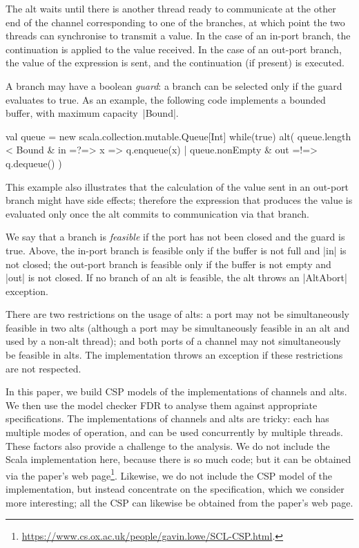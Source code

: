 The alt waits until there is another thread ready to communicate at the other
end of the channel corresponding to one of the branches, at which point the
two threads can synchronise to transmit a value.  In the case of an in-port
branch, the continuation is applied to the value received.  In the case of an
out-port branch, the value of the expression is sent, and the continuation (if
present) is executed.

A branch may have a boolean \emph{guard}: a branch can be selected only if the
guard evaluates to true.  As an example, the following code implements a
bounded buffer, with maximum capacity~|Bound|.
%
\begin{scala}
val queue = new scala.collection.mutable.Queue[Int]
while(true){
  alt(
    queue.length < Bound & in =?=> { x => q.enqueue(x) }
    | queue.nonEmpty & out =!=> { q.dequeue() }
  )    
}
\end{scala}
%
This example also illustrates that the calculation of the value sent in an
out-port branch might have side effects; therefore the expression that produces
the value is evaluated only once the alt commits to communication via that
branch.

We say that a branch is \emph{feasible} if the port has not been closed and
the guard is true.  Above, the in-port branch is feasible only if the buffer is
not full and |in| is not closed; the out-port branch is feasible only if the
buffer is not empty and |out| is not closed.  If no branch of an alt is
feasible, the alt throws an |AltAbort| exception.


There are two restrictions on the usage of alts: a port may not be
simultaneously feasible in two alts (although a port may be simultaneously
feasible in an alt and used by a non-alt thread); and both ports of a channel
may not simultaneously be feasible in alts.  The implementation throws an
exception if these restrictions are not respected.

In this paper, we build CSP models of the implementations of channels and
alts.  We then use the model checker FDR to analyse them against appropriate
specifications. 
%
The implementations of channels and alts are tricky: each has multiple modes
of operation, and can be used concurrently by multiple threads.  These factors
also provide a challenge to the analysis.
%
We do not include the Scala implementation here, because there is so much
code; but it can be obtained via the paper's web
page\footnote{\url{https://www.cs.ox.ac.uk/people/gavin.lowe/SCL-CSP.html}.}. 
Likewise, we do not include the CSP model of the implementation, but instead
concentrate on the specification, which we consider more interesting; all the
CSP can likewise be obtained from the paper's web page.

